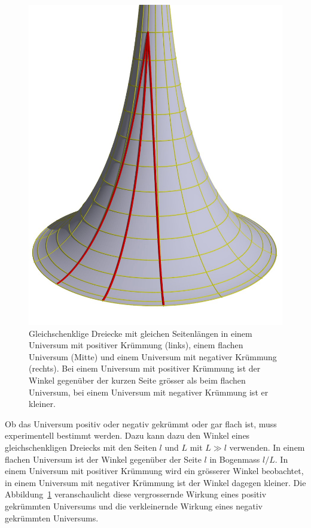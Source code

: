 \begin{figure}
\includegraphics[height=6truecm]{chapters/3d/negativ.jpg}
\caption{Gleichschenklige Dreiecke mit gleichen Seitenlängen in einem
Universum mit positiver Krümmung (links), einem flachen Universum (Mitte)
und einem Universum mit negativer Krümmung (rechts).
Bei einem Universum mit positiver Krümmung ist der Winkel gegenüber
der kurzen Seite grösser als beim flachen Universum, bei einem
Universum mit negativer Krümmung ist er kleiner.
\label{skript:robertson:vergroesserung}}
\end{figure}
Ob das Universum positiv oder negativ gekrümmt oder gar flach ist,
muss experimentell bestimmt werden.
Dazu kann dazu den Winkel eines gleichschenkligen Dreiecks mit den
Seiten $l$ und $L$ mit $L\gg l$ verwenden.
In einem flachen Universum ist der Winkel gegenüber der Seite $l$
in Bogenmass $l/L$.
In einem Universum mit positiver Krümmung wird ein grösserer Winkel
beobachtet, in einem Universum mit negativer Krümmung ist der Winkel
dagegen kleiner.
Die Abbildung~\ref{skript:robertson:vergroesserung} veranschaulicht
diese vergrossernde Wirkung eines positiv gekrümmten Universums
und die verkleinernde Wirkung eines negativ gekrümmten Universums.

